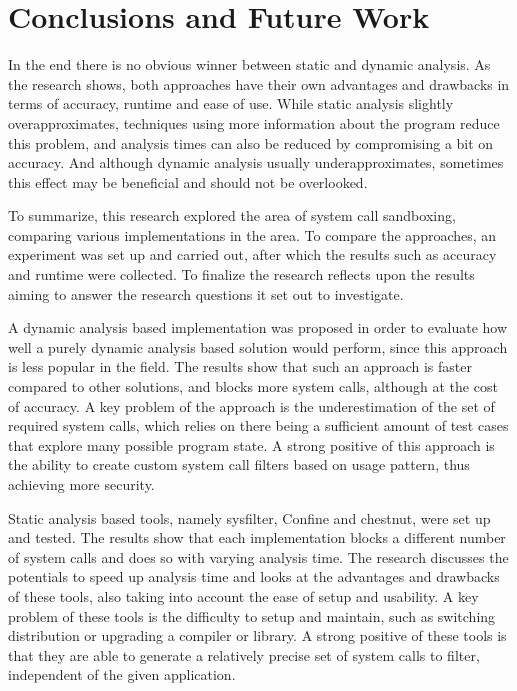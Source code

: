 \section{Conclusions and Future Work}
\label{sec:conclusion}
In the end there is no obvious winner between static and dynamic analysis.
As the research shows, both approaches have their own advantages and drawbacks in terms of accuracy, runtime and ease of use.
While static analysis slightly overapproximates, techniques using more information about the program reduce this problem, and analysis times can also be reduced by compromising a bit on accuracy.
And although dynamic analysis usually underapproximates, sometimes this effect may be beneficial and should not be overlooked.

To summarize, this research explored the area of system call sandboxing, comparing various implementations in the area. To compare the approaches, an experiment was set up and carried out, after which the results such as accuracy and runtime were collected. To finalize the research reflects upon the results aiming to answer the research questions it set out to investigate.

A dynamic analysis based implementation was proposed in order to evaluate how well a purely dynamic analysis based solution would perform, since this approach is less popular in the field.
The results show that such an approach is faster compared to other solutions, and blocks more system calls, although at the cost of accuracy.
A key problem of the approach is the underestimation of the set of required system calls, which relies on there being a sufficient amount of test cases that explore many possible program state.
A strong positive of this approach is the ability to create custom system call filters based on usage pattern, thus achieving more security.

Static analysis based tools, namely sysfilter, Confine and chestnut, were set up and tested.
The results show that each implementation blocks a different number of system calls and does so with varying analysis time.
The research discusses the potentials to speed up analysis time and looks at the advantages and drawbacks of these tools, also taking into account the ease of setup and usability.
A key problem of these tools is the difficulty to setup and maintain, such as switching distribution or upgrading a compiler or library.
A strong positive of these tools is that they are able to generate a relatively precise set of system calls to filter, independent of the given application.

